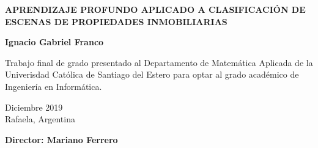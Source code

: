 \begin{titlepage}
	
	\begin{center}
		
		\vspace*{4\baselineskip}
	
		
		{\LARGE \textbf{APRENDIZAJE PROFUNDO APLICADO A CLASIFICACIÓN DE ESCENAS DE PROPIEDADES INMOBILIARIAS \\}}
		        \vspace*{1.5\baselineskip}

		
        \vspace*{1,5\baselineskip}

		\large{\textbf{Ignacio Gabriel Franco}}\\
		
		\vspace{1,5\baselineskip}
		
		\large{Trabajo final de grado presentado al Departamento de Matemática Aplicada de la Univerisdad Católica de Santiago del Estero para optar al grado académico de Ingeniería en Informática.} 
		
		\vspace{1,5\baselineskip}
		Diciembre 2019\\
		Rafaela, Argentina 
\vspace{1,5\baselineskip}

		\large{\textbf{Director: Mariano Ferrero}}\\ 

	\end{center}
	
	
\end{titlepage}